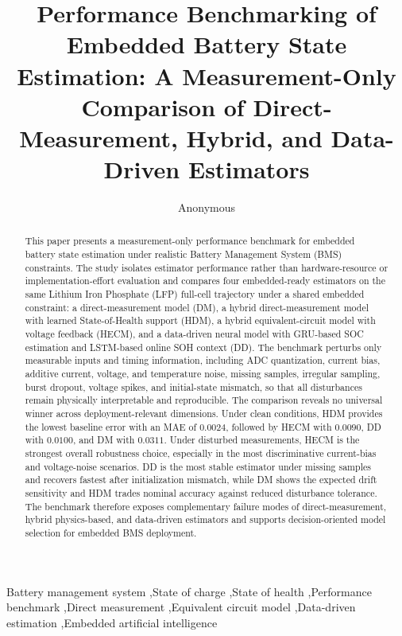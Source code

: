 \documentclass[review]{elsarticle}
\date{}
\begin{document}
\linenumbers
\begin{frontmatter}
\title{Performance Benchmarking of Embedded Battery State Estimation: A Measurement-Only Comparison of Direct-Measurement, Hybrid, and Data-Driven Estimators}
\author{Anonymous}
\begin{abstract}
This paper presents a measurement-only performance benchmark for embedded battery state estimation under realistic Battery Management System (BMS) constraints. The study isolates estimator performance rather than hardware-resource or implementation-effort evaluation and compares four embedded-ready estimators on the same Lithium Iron Phosphate (LFP) full-cell trajectory under a shared embedded constraint: a direct-measurement model (DM), a hybrid direct-measurement model with learned State-of-Health support (HDM), a hybrid equivalent-circuit model with voltage feedback (HECM), and a data-driven neural model with GRU-based SOC estimation and LSTM-based online SOH context (DD). The benchmark perturbs only measurable inputs and timing information, including ADC quantization, current bias, additive current, voltage, and temperature noise, missing samples, irregular sampling, burst dropout, voltage spikes, and initial-state mismatch, so that all disturbances remain physically interpretable and reproducible. The comparison reveals no universal winner across deployment-relevant dimensions. Under clean conditions, HDM provides the lowest baseline error with an MAE of $0.0024$, followed by HECM with $0.0090$, DD with $0.0100$, and DM with $0.0311$. Under disturbed measurements, HECM is the strongest overall robustness choice, especially in the most discriminative current-bias and voltage-noise scenarios. DD is the most stable estimator under missing samples and recovers fastest after initialization mismatch, while DM shows the expected drift sensitivity and HDM trades nominal accuracy against reduced disturbance tolerance. The benchmark therefore exposes complementary failure modes of direct-measurement, hybrid physics-based, and data-driven estimators and supports decision-oriented model selection for embedded BMS deployment.
\end{abstract}
\begin{keyword}
Battery management system \sep State of charge \sep State of health \sep Performance benchmark \sep Direct measurement \sep Equivalent circuit model \sep Data-driven estimation \sep Embedded artificial intelligence
\end{keyword}
\end{frontmatter}
\end{document}
